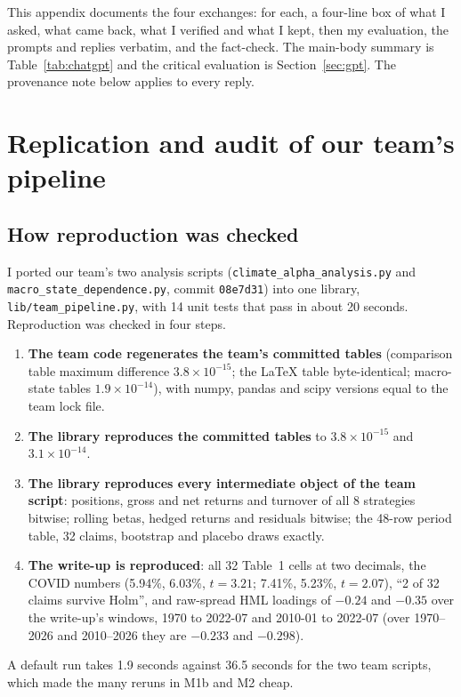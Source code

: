 This appendix documents the four exchanges: for each, a four-line box of what I asked, what came back, what I verified and what I kept, then my evaluation, the prompts and replies verbatim, and the fact-check. The main-body summary is Table~\ref{tab:chatgpt} and the critical evaluation is Section~\ref{sec:gpt}. The provenance note below applies to every reply.



\clearpage
\section{Replication and audit of our team's pipeline}
\label{app:replication}

\subsection{How reproduction was checked}
I ported our team's two analysis scripts (\texttt{climate\_alpha\_\allowbreak analysis.py} and \texttt{macro\_state\_\allowbreak dependence.py}, commit \texttt{08e7d31}) into one library, \texttt{lib/\allowbreak team\_pipeline.py}, with 14 unit tests that pass in about 20 seconds. Reproduction was checked in four steps.
\begin{enumerate}
\item \textbf{The team code regenerates the team's committed tables} (comparison table maximum difference $3.8\times10^{-15}$; the \LaTeX{} table byte-identical; macro-state tables $1.9\times10^{-14}$), with numpy, pandas and scipy versions equal to the team lock file.
\item \textbf{The library reproduces the committed tables} to $3.8\times10^{-15}$ and $3.1\times10^{-14}$.
\item \textbf{The library reproduces every intermediate object of the team script}: positions, gross and net returns and turnover of all 8 strategies bitwise; rolling betas, hedged returns and residuals bitwise; the 48-row period table, 32 claims, bootstrap and placebo draws exactly.
\item \textbf{The write-up is reproduced}: all 32 Table~1 cells at two decimals, the COVID numbers (5.94\%, 6.03\%, $t=3.21$; 7.41\%, 5.23\%, $t=2.07$), ``2 of 32 claims survive Holm'', and raw-spread HML loadings of $-0.24$ and $-0.35$ over the write-up's windows, 1970 to 2022-07 and 2010-01 to 2022-07 (over 1970--2026 and 2010--2026 they are $-0.233$ and $-0.298$).
\end{enumerate}
A default run takes 1.9 seconds against 36.5 seconds for the two team scripts, which made the many reruns in M1b and M2 cheap.


